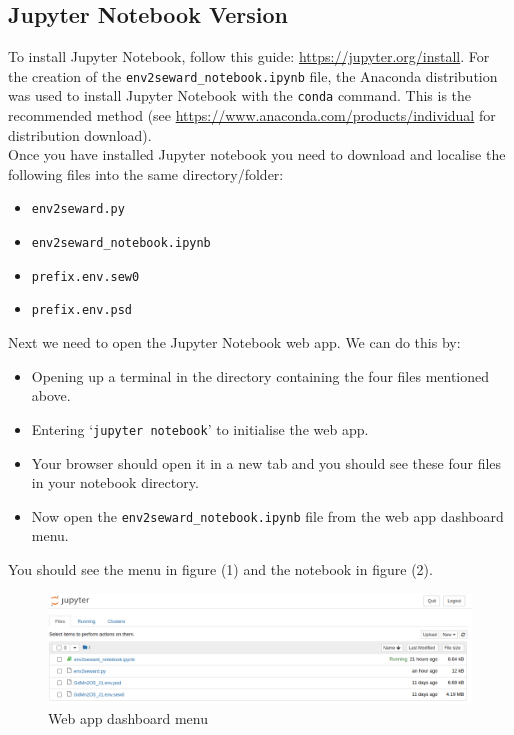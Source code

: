 \documentclass[10pt]{article}
\begin{document}
\subsection{Jupyter Notebook Version}
To install Jupyter Notebook, follow this guide: \url{https://jupyter.org/install}. For the creation of the \texttt{env2seward\_notebook.ipynb} file, the Anaconda distribution was used to install Jupyter Notebook with the \texttt{conda} command. This is the recommended method (see \url{https://www.anaconda.com/products/individual} for distribution download). 
\\
Once you have installed Jupyter notebook you need to download and localise the following files into the same directory/folder:

\begin{itemize}
	\item \texttt{env2seward.py}
	\item \texttt{env2seward\_notebook.ipynb}
	\item \texttt{prefix.env.sew0}
	\item \texttt{prefix.env.psd}
\end{itemize}
Next we need to open the Jupyter Notebook web app. We can do this by:

\begin{itemize}
	\item Opening up a terminal in the directory containing the four files mentioned above.
	\item Entering `\texttt{jupyter notebook}' to initialise the web app.
	\item Your browser should open it in a new tab and you should see these four files in your notebook directory.
	\item Now open the \texttt{env2seward\_notebook.ipynb} file from the web app dashboard menu.
\end{itemize}

You should see the menu in figure (1) and the notebook in figure (2).

\begin{figure}
	\centering
	\includegraphics[width=1.3\linewidth]{"dashboard.png"}
	\caption{Web app dashboard menu}
	\label{fig:screenshot-from-2020-06-23-12-26-13}
\end{figure}
\end{document}

